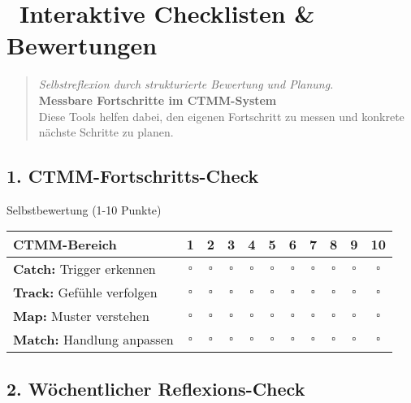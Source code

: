 
\newpage
\section*{\textcolor{ctmmOrange}{\faCheckSquare~Interaktive Checklisten \& Bewertungen}}
\label{sec:interactive}

\begin{quote}
\textit{\textcolor{ctmmOrange}{Selbstreflexion durch strukturierte Bewertung und Planung.}}\\
\textbf{\textcolor{ctmmOrange}{Messbare Fortschritte im CTMM-System}}\\
Diese Tools helfen dabei, den eigenen Fortschritt zu messen und konkrete nächste Schritte zu planen.
\end{quote}

\subsection*{\textcolor{ctmmOrange}{1. CTMM-Fortschritts-Check}}

\begin{ctmmOrangeBox}{Selbstbewertung (1-10 Punkte)}
\begin{tabular}{|p{6cm}|c|c|c|c|c|c|c|c|c|c|}
\hline
\textbf{CTMM-Bereich} & \textbf{1} & \textbf{2} & \textbf{3} & \textbf{4} & \textbf{5} & \textbf{6} & \textbf{7} & \textbf{8} & \textbf{9} & \textbf{10} \\
\hline
\textbf{Catch:} Trigger erkennen & $\square$ & $\square$ & $\square$ & $\square$ & $\square$ & $\square$ & $\square$ & $\square$ & $\square$ & $\square$ \\
\hline
\textbf{Track:} Gefühle verfolgen & $\square$ & $\square$ & $\square$ & $\square$ & $\square$ & $\square$ & $\square$ & $\square$ & $\square$ & $\square$ \\
\hline
\textbf{Map:} Muster verstehen & $\square$ & $\square$ & $\square$ & $\square$ & $\square$ & $\square$ & $\square$ & $\square$ & $\square$ & $\square$ \\
\hline
\textbf{Match:} Handlung anpassen & $\square$ & $\square$ & $\square$ & $\square$ & $\square$ & $\square$ & $\square$ & $\square$ & $\square$ & $\square$ \\
\hline
\end{tabular}
\end{ctmmOrangeBox}

\subsection*{\textcolor{ctmmOrange}{2. Wöchentlicher Reflexions-Check}}

